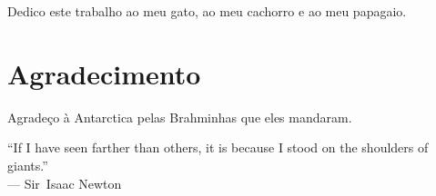 


%
%

\begin{dedicatoria}
Dedico este trabalho ao meu gato, ao meu cachorro e ao meu papagaio.
\end{dedicatoria}

%
%
%

\chapter*{Agradecimento}
Agradeço à Antarctica pelas Brahminhas que eles mandaram.

%
%
\begin{epigrafe}
``If I have seen farther than others, it is because I stood on the shoulders of giants.''\\
--- Sir~Isaac Newton
\end{epigrafe}
